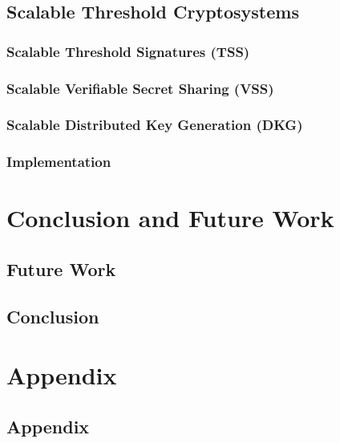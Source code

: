 \documentclass[12pt,twoside,singlespace]{mitthesis}
\begin{document}
    \chapter{Scalable Threshold Cryptosystems}
    \label{s:threshcrypto:scalable-systems}
    
        \section{Scalable Threshold Signatures (TSS)}
        \label{s:threshsig}
        
        
        \section{Scalable Verifiable Secret Sharing (VSS)}
        \label{s:scalable-vss}
        
        
        \section{Scalable Distributed Key Generation (DKG)}
        \label{s:scalable-dkg}
        
        
        \section{Implementation}
        \label{s:threshcrypto:eval}
        

%
%
\part{Conclusion and Future Work}

    \chapter{Future Work}
    
    
    
    \chapter{Conclusion}
    \label{s:conclusion}
    

\cleardoublepage
\part{Appendix}
\appendix
\chapter{Appendix}




\end{document}
